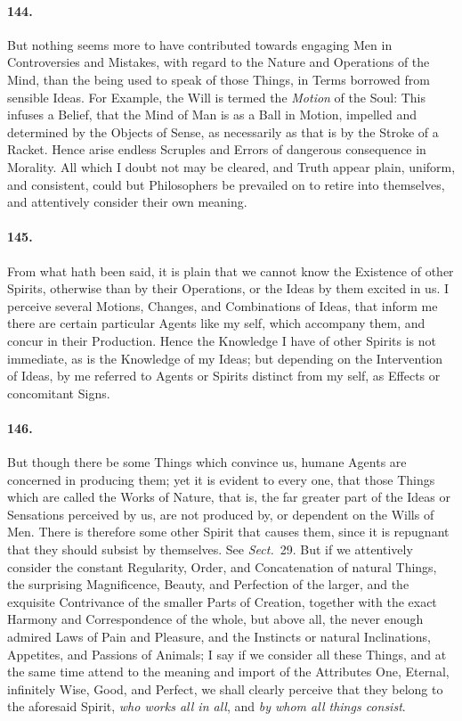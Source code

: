 \documentclass[]{article}
\newenvironment{sectionbody}{\begin{multicols}{2}}{\end{multicols}}
\begin{document}
\begin{sectionbody}
\paragraph{144.} But nothing seems more to have contributed towards engaging Men
in Controversies and Mistakes, with regard to the Nature and
Operations of the Mind, than the being used to speak of those
Things, in Terms borrowed from sensible Ideas.  For Example, the
Will is termed the \emph{Motion} of the Soul: This infuses a
Belief, that the Mind of Man is as a Ball in Motion, impelled and
determined by the Objects of Sense, as necessarily as that is by
the Stroke of a Racket.  Hence arise endless Scruples and Errors
of dangerous consequence in Morality.  All which I doubt not may
be cleared, and Truth appear plain, uniform, and consistent,
could but Philosophers be prevailed on to retire into themselves,
and attentively consider their own meaning.



\paragraph{145.} From what hath been said, it is plain that we cannot know the
Existence of other Spirits, otherwise than by their Operations,
or the Ideas by them excited in us.  I perceive several Motions,
Changes, and Combinations of Ideas, that inform me there are
certain particular Agents like my self, which accompany them, and
concur in their Production.  Hence the Knowledge I have of other
Spirits is not immediate, as is the Knowledge of my Ideas; but
depending on the Intervention of Ideas, by me referred to Agents
or Spirits distinct from my self, as Effects or concomitant
Signs.



\paragraph{146.} But though there be some Things which convince us, humane Agents
are concerned in producing them; yet it is evident to every one,
that those Things which are called the Works of Nature, that is,
the far greater part of the Ideas or Sensations perceived by us,
are not produced by, or dependent on the Wills of Men.  There is
therefore some other Spirit that causes them, since it is
repugnant that they should subsist by themselves.  See
\emph{Sect.}~29.
But if we attentively consider the constant Regularity, Order,
and Concatenation of natural Things, the surprising Magnificence,
Beauty, and Perfection of the larger, and the exquisite
Contrivance of the smaller Parts of Creation, together with the
exact Harmony and Correspondence of the whole, but above all, the
never enough admired Laws of Pain and Pleasure, and the Instincts
or natural Inclinations, Appetites, and Passions of Animals; I
say if we consider all these Things, and at the same time attend
to the meaning and import of the Attributes One, Eternal,
infinitely Wise, Good, and Perfect, we shall clearly perceive
that they belong to the aforesaid Spirit, \emph{who works all in
all}, and \emph{by whom all things consist}.




\end{sectionbody}
\end{document}

